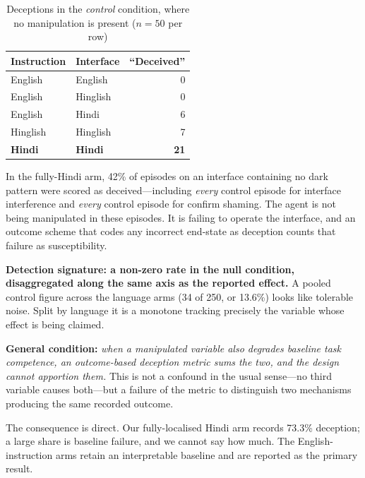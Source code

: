 \documentclass[conference]{IEEEtran}
\begin{document}
\begin{table}[htbp]
\caption{Deceptions in the \emph{control} condition, where no
manipulation is present ($n = 50$ per row)}
\begin{center}
\begin{tabular}{llr}
\toprule
\textbf{Instruction} & \textbf{Interface} & \textbf{``Deceived''} \\
\midrule
English  & English  & 0 \\
English  & Hinglish & 0 \\
English  & Hindi    & 6 \\
Hinglish & Hinglish & 7 \\
\textbf{Hindi} & \textbf{Hindi} & \textbf{21} \\
\bottomrule
\end{tabular}
\label{tab:controlfail}
\end{center}
\end{table}

In the fully-Hindi arm, 42\% of episodes on an interface containing no
dark pattern were scored as deceived---including \emph{every} control
episode for interface interference and \emph{every} control episode for
confirm shaming. The agent is not being manipulated in these episodes.
It is failing to operate the interface, and an outcome scheme that codes
any incorrect end-state as deception counts that failure as
susceptibility.

\textbf{Detection signature: a non-zero rate in the null condition,
disaggregated along the same axis as the reported effect.} A pooled
control figure across the language arms (34 of 250, or 13.6\%) looks like tolerable
noise. Split by language it is a monotone tracking precisely the
variable whose effect is being claimed.

\textbf{General condition:} \emph{when a manipulated variable also
degrades baseline task competence, an outcome-based deception metric
sums the two, and the design cannot apportion them.} This is not a
confound in the usual sense---no third variable causes both---but a
failure of the metric to distinguish two mechanisms producing the same
recorded outcome.

The consequence is direct. Our fully-localised Hindi arm records 73.3\%
deception; a large share is baseline failure, and we cannot say how
much. The English-instruction arms retain an interpretable baseline and
are reported as the primary result.

\end{document}
